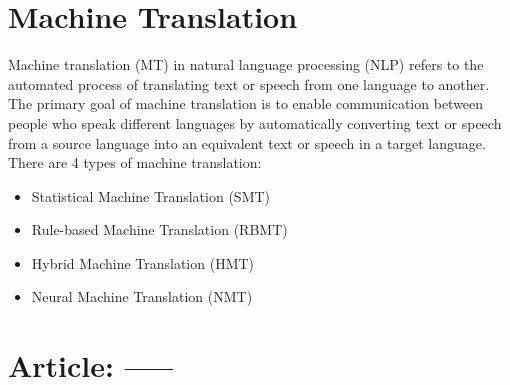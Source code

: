 \documentclass{article}
\begin{document}
\section{Machine Translation}
Machine translation (MT) in natural language processing (NLP) refers to the automated process of translating text or speech from one language to another. The primary goal of machine translation is to enable communication between people who speak different languages by automatically converting text or speech from a source language into an equivalent text or speech in a target language. There are 4 types of machine translation:
\begin{itemize}
  \item Statistical Machine Translation (SMT)
  \item Rule-based Machine Translation (RBMT)
  \item Hybrid Machine Translation (HMT)
  \item Neural Machine Translation (NMT)
\end{itemize}
\pagebreak

\section{Article: -----}
\end{document}
